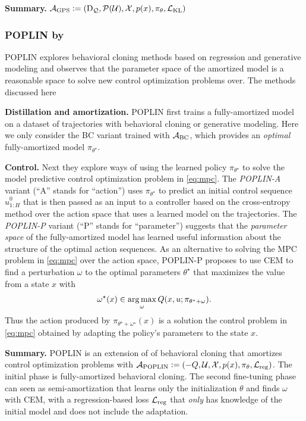 \documentclass[twoside,11pt]{article}
\begin{document}
\textbf{Summary.}
${\mathcal{A}}_{\rm GPS}\vcentcolon= (\mathrm{D}_{\mathcal{Q}}, {\mathcal{P}}({\mathcal{U}}), {\mathcal{X}}, p(x), \pi_\theta, {\mathcal{L}}_{\rm KL})$

\subsubsection{POPLIN by \citet{wang2019exploring}}
POPLIN explores behavioral cloning methods based on regression
and generative modeling and observes that the
parameter space of the amortized model is a reasonable
space to solve new control optimization problems over.
The methods discussed here

\textbf{Distillation and amortization.}
POPLIN first trains a fully-amortized
model on a dataset of trajectories with behavioral cloning
or generative modeling.
Here we only consider the BC variant trained with
${\mathcal{A}}_{\rm BC}$, which provides an \emph{optimal}
fully-amortized model $\pi_{\theta^\star}$.

\textbf{Control.}
Next they explore ways of using the learned policy
$\pi_{\theta^\star}$ to solve the model predictive
control optimization problem in \cref{eq:mpc}.
The \emph{POPLIN-A} variant (``A'' stands for ``action'')
uses $\pi_{\theta^\star}$ to predict an initial
control sequence $\hat u^0_{1:H}$ that is then passed as
an input to a controller based on the cross-entropy method
over the action space that uses a learned model on the trajectories.
The \emph{POPLIN-P} variant (``P'' stands for ``parameter'')
suggests that the \emph{parameter space} of the fully-amortized
model has learned useful information about the structure
of the optimal action sequences.
As an alternative to solving the MPC problem in \cref{eq:mpc}
over the action space,
POPLIN-P proposes to use CEM to find a
perturbation $\omega$ to the optimal parameters $\theta^\star$
that maximizes the value from a state $x$ with
\begin{equation}
  \omega^\star(x) \in \operatorname*{arg\,max}_\omega Q(x, u;
    \pi_{\theta^\star+\omega}).
  \label{eq:POPLIN-P}
\end{equation}
Thus the action produced by
$\pi_{\theta^\star+\omega^\star}(x)$
is a solution the control problem in \cref{eq:mpc}
obtained by adapting the policy's parameters to the
state $x$.

\textbf{Summary.} POPLIN is an extension of
of behavioral cloning that amortizes control optimization
problems with
${\mathcal{A}}_{\rm POPLIN}\vcentcolon= (-Q, {\mathcal{U}}, {\mathcal{X}}, p(x), \pi_\theta, {\mathcal{L}}_{\rm reg})$.
The initial phase is fully-amortized behavioral cloning.
The second fine-tuning phase can seen as semi-amortization
that learns only the initialization $\theta$ and
finds $\omega$ with CEM, with a regression-based loss ${\mathcal{L}}_{\rm reg}$
that \emph{only} has knowledge of the initial model and does not include
the adaptation.
\end{document}
